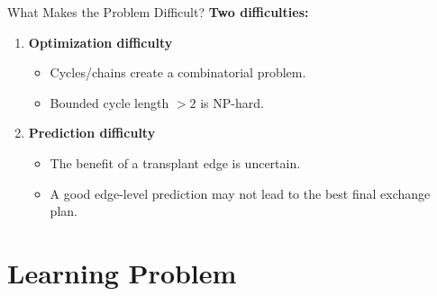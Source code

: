 \documentclass[aspectratio=169]{beamer}
\begin{document}
\begin{frame}{What Makes the Problem Difficult?}
  \large
  \textbf{Two difficulties:}

  \vspace{0.8em}
  \begin{enumerate}
    \item \textbf{Optimization difficulty}
    \begin{itemize}
      \item Cycles/chains create a combinatorial problem.
      \item Bounded cycle length \(>2\) is NP-hard.
    \end{itemize}

    \vspace{0.8em}
    \item \textbf{Prediction difficulty}
    \begin{itemize}
      \item The benefit of a transplant edge is uncertain.
      \item A good edge-level prediction may not lead to the best final exchange plan.
    \end{itemize}
  \end{enumerate}
\end{frame}

\section{Learning Problem}
\end{document}
